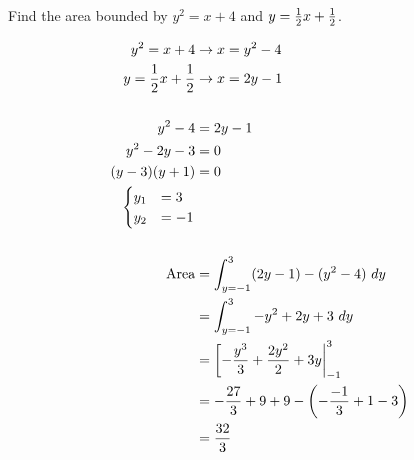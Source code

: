 \begin{exercise}\nonumber
    Find the area bounded by $ y^2 = x + 4 $ and $ y = {1 \over 2}x + {1 \over 2} $. \\

    \begin{figure}[H]
        \centering
    \end{figure}

    \begin{align}
        y^2 = x + 4                    & \rightarrow x = y^2 - 4                                        \\
        y = {1 \over 2}x + {1 \over 2} & \rightarrow x = 2y - 1                                         \\
        \\
        y^2 - 4                        & = 2y - 1                                                       \\
        y^2 - 2y - 3                   & = 0                                                            \\
        (y - 3)(y + 1)                 & = 0                                                            \\
        \begin{cases}
            y_1 & = 3  \\
            y_2 & = -1 \\
        \end{cases}
        \\
        \\
        \text{Area}                    & = \int_{y=-1}^3 (2y - 1) - (y^2 - 4) \ dy                      \\
                                       & = \int_{y=-1}^3 -y^2 + 2y + 3 \ dy                             \\
                                       & = \left[ {-{y^3 \over 3} + {2y^2 \over 2} + 3y} \right|_{-1}^3 \\
                                       & = -{27 \over 3} + 9 + 9 - \left(-{-1 \over 3} + 1 - 3\right)   \\
                                       & = {32 \over 3}
    \end{align}
\end{exercise}